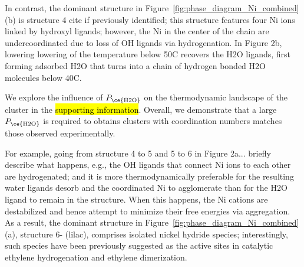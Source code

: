 In contrast, the dominant structure in Figure~\ref{fig:phase_diagram_Ni_combined} (b) is structure 4 cite if previously identified; this structure features four Ni ions linked by hydroxyl ligands; however, the Ni in the center of the chain are undercoordinated due to loss of OH ligands via hydrogenation. In Figure 2b, lowering lowering of the temperature below 50\degrees C recovers the H2O ligands, first forming adsorbed H2O that turns into a chain of hydrogen bonded H2O molecules below 40\degrees C.

We explore the influence of $P_{\text{\ce{H2O}}}$ on the thermodynamic landscape of the  cluster in the \hl{supporting information}. Overall, we demonstrate that a large $P_{\text{\ce{H2O}}}$ is required to obtains  clusters with coordination numbers matches those observed experimentally. 

For example, going from structure 4 to 5 and 5 to 6 in Figure 2a... briefly describe what happens, e.g., the OH ligands that connect Ni ions to each other are hydrogenated; and it is more thermodynamically preferable for the resulting water ligands desorb and the coordinated Ni to agglomerate than for the H2O ligand to remain in the structure. When this happens, the Ni cations are destabilized and hence attempt to minimize their free energies via aggregation. As a result, the dominant structure in Figure~\ref{fig:phase_diagram_Ni_combined} (a), structure 6- (lilac), comprises isolated nickel hydride species; interestingly, such species have been previously suggested as the active sites in catalytic ethylene hydrogenation\cite{Li2016sintering,Shabbir2020} and ethylene dimerization.\cite{Ye2017} 




